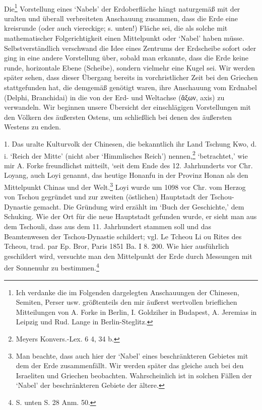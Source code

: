 \documentclass[a4paper, 11pt, oneside]{article}
\begin{document}
\paragraph{}
Die\footnote{Ich verdanke die im Folgenden dargelegten Anschauungen der Chinesen, Semiten, Perser usw. größtenteils den mir äußerst wertvollen brieflichen Mitteilungen von A. Forke in Berlin, I. Goldziher in Budapest, A. Jeremias in Leipzig und Rud. Lange in Berlin-Steglitz.} Vorstellung eines `Nabels' der Erdoberfläche hängt naturgemäß mit der uralten und überall verbreiteten Anschauung zusammen, dass die Erde eine kreisrunde (oder auch viereckige; s. unten!) Fläche sei, die als solche mit mathematischer Folgerichtigkeit einen Mittelpunkt oder `Nabel' haben müsse. Selbstverständlich verschwand die Idee eines Zentrums der Erdscheibe sofort oder ging in eine andere Vorstellung über, sobald man erkannte, dass die Erde keine runde, horizontale Ebene (Scheibe), sondern vielmehr eine Kugel sei. Wir werden später sehen, dass dieser Übergang bereits in vorchristlicher Zeit bei den Griechen stattgefunden hat, die demgemäß genötigt waren, ihre Anschauung vom Erdnabel (Delphi, Branchidai) in die von der Erd- und Weltachse (ἄξων, axis) zu verwandeln. Wir beginnen unsere Übersicht der einschlägigen Vorstellungen mit den Völkern des äußersten Ostens, um schließlich bei denen des äußersten Westens zu enden.

1. Das uralte Kulturvolk der Chinesen, die bekanntlich ihr Land Tschung Kwo, d. i. `Reich der Mitte' (nicht aber `Himmlisches Reich') nennen,\footnote{Meyers Konvers.-Lex. 6 4, 34 b.} `betrachtet,' wie mir A. Forke freundlichst mitteilt, `seit dem Ende des 12. Jahrhunderts vor Chr. Loyang, auch Loyi genannt, das heutige Honanfu in der Provinz Honan als den Mittelpunkt Chinas und der Welt.\footnote{Man beachte, dass auch hier der `Nabel' eines beschränkteren Gebietes mit dem der Erde zusammenfällt. Wir werden später das gleiche auch bei den Israeliten und Griechen beobachten. Wahrscheinlich ist in solchen Fällen der `Nabel' der beschränkteren Gebiete der ältere.} Loyi wurde um 1098 vor Chr. vom Herzog von Tschou gegründet und zur zweiten (östlichen) Hauptstadt der Tschou-Dynastie gemacht. Die Gründung wird erzählt im `Buch der Geschichte,' dem Schuking. Wie der Ort für die neue Hauptstadt gefunden wurde, er sieht man aus dem Tschouli, dass aus dem 11. Jahrhundert stammen soll und das Beamtenwesen der Tschou-Dynastie schildert; vgl. Le Tcheou Li ou Rites des Tcheou, trad. par Ep. Bror, Paris 1851 Ba. I 8. 200. Wie hier ausführlich geschildert wird, versuchte man den Mittelpunkt der Erde durch Messungen mit der Sonnenuhr zu bestimmen.\footnote{S. unten S. 28 Anm. 50.}
\end{document}
